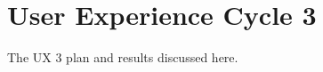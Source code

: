 \chapter{User Experience Cycle 3}
\label{ch:ux3-cycle_report}

The UX 3 plan and results discussed here.